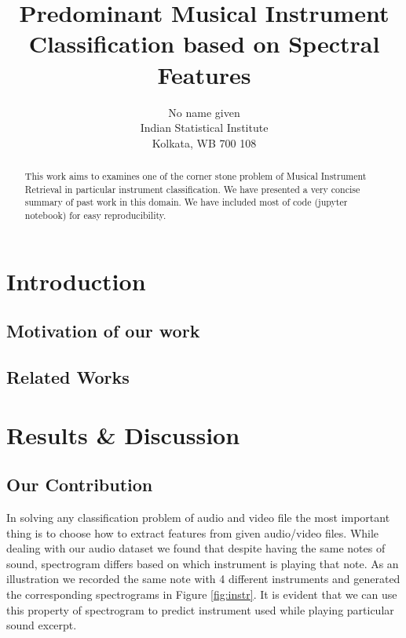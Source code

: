\documentclass{article}
\title{Predominant Musical Instrument Classification based on Spectral Features}
\author{%
  No name given\\
  Indian Statistical Institute\\
  Kolkata, WB 700 108}
\begin{document}

\maketitle

\begin{abstract}
  This work aims to examines one of the corner stone problem of Musical Instrument Retrieval in particular instrument classification. We have presented a very concise summary of past work in this domain. We have included most of  code (jupyter notebook) for easy reproducibility.
\end{abstract}



\section{Introduction}
\lipsum[6]
\subsection{Motivation of our work}

\subsection{Related Works}
\section{Results \& Discussion}






\subsection{Our Contribution}

In solving any classification problem of audio and video file the most important thing is to choose how to extract features from given audio/video files. While dealing with our audio dataset we found that despite having  the same  notes of sound, spectrogram differs based on which instrument is playing that note. As an illustration we recorded the same note with 4 different instruments and generated the corresponding spectrograms in Figure \ref{fig:instr}. It is evident that we can use this property of spectrogram to predict instrument used while playing particular sound excerpt. 
\end{document}
